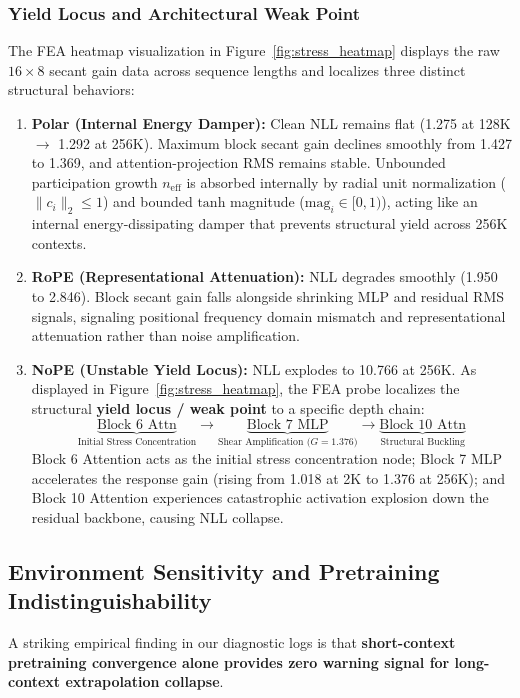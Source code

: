 \documentclass{article} %
\begin{document}
\subsubsection{Yield Locus and Architectural Weak Point}
The FEA heatmap visualization in Figure~\ref{fig:stress_heatmap} displays the raw $16 \times 8$ secant gain data across sequence lengths and localizes three distinct structural behaviors:
\begin{enumerate}
    \item \textbf{Polar (Internal Energy Damper):} Clean NLL remains flat (1.275 at 128K $\to$ 1.292 at 256K). Maximum block secant gain declines smoothly from 1.427 to 1.369, and attention-projection RMS remains stable. Unbounded participation growth $n_{\mathrm{eff}}$ is absorbed internally by radial unit normalization ($\|c_i\|_2 \le 1$) and bounded $\mathrm{tanh}$ magnitude ($\mathrm{mag}_i \in [0, 1)$), acting like an internal energy-dissipating damper that prevents structural yield across 256K contexts.
    \item \textbf{RoPE (Representational Attenuation):} NLL degrades smoothly (1.950 to 2.846). Block secant gain falls alongside shrinking MLP and residual RMS signals, signaling positional frequency domain mismatch and representational attenuation rather than noise amplification.
    \item \textbf{NoPE (Unstable Yield Locus):} NLL explodes to 10.766 at 256K. As displayed in Figure~\ref{fig:stress_heatmap}, the FEA probe localizes the structural \textbf{yield locus / weak point} to a specific depth chain:
    \begin{equation}
        \underbrace{\text{Block 6 Attn}}_{\text{Initial Stress Concentration}} \longrightarrow \underbrace{\text{Block 7 MLP}}_{\text{Shear Amplification ($G=1.376$)}} \longrightarrow \underbrace{\text{Block 10 Attn}}_{\text{Structural Buckling}}
    \end{equation}
    Block 6 Attention acts as the initial stress concentration node; Block 7 MLP accelerates the response gain (rising from 1.018 at 2K to 1.376 at 256K); and Block 10 Attention experiences catastrophic activation explosion down the residual backbone, causing NLL collapse.
\end{enumerate}

\FloatBarrier
\subsection{Environment Sensitivity and Pretraining Indistinguishability}
A striking empirical finding in our diagnostic logs is that \textbf{short-context pretraining convergence alone provides zero warning signal for long-context extrapolation collapse}. 
\end{document}
